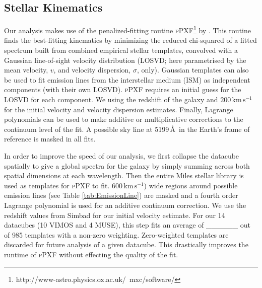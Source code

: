 	\subsection{Stellar Kinematics}
		\label{subsec:StellarFit}
		Our analysis makes use of the penalized-fitting routine \textsc{pPXF}\footnote{http://www-astro.physics.ox.ac.uk/~mxc/software/} by \citet{Cappellari2004, Cappellari2016a}. This routine finds the best-fitting kinematics by minimizing the reduced chi-squared of a fitted spectrum built from combined empirical stellar templates, convolved with a Gaussian line-of-sight velocity distribution (LOSVD; here parametrised by the mean velocity, $v$, and velocity dispersion, $\sigma$, only). Gaussian templates can also be used to fit emission lines from the interstellar medium (ISM) as independent components (with their own LOSVD). \textsc{pPXF} requires an initial guess for the LOSVD for each component. We using the redshift of the galaxy and $200\,\mathrm{km\,s^{-1}}$ for the initial velocity and velocity dispersion estimates. Finally, Lagrange polynomials can be used to make additive or multiplicative corrections to the continuum level of the fit. A possible sky line at 5199\,\AA\ in the Earth's frame of reference is masked in all fits.

		In order to improve the speed of our analysis, we first collapse the datacube spatially to give a global spectra for the galaxy by simply summing across both spatial dimensions at each wavelength. Then the entire Miles stellar library \citep{Sanchez-Blazquez2006, Falcon-Barroso2011a} is used as templates for \textsc{pPXF} to fit. $600\,\mathrm{km\,s^{-1}}$) wide regions around possible emission lines (see Table \ref{tab:EmissionLine}) are masked and a fourth order Lagrange polynomial is used for an additive continuum correction. We use the redshift values from Simbad \citep{Wenger2000} for our initial velocity estimate. For our 14 datacubes (10 VIMOS and 4 MUSE), this step fits an average of \_\_\_\_\_\_ out of 985 templates with a non-zero weighting. Zero-weighted templates are discarded for future analysis of a given datacube. This drastically improves the runtime of \textsc{pPXF} without effecting the quality of the fit.




